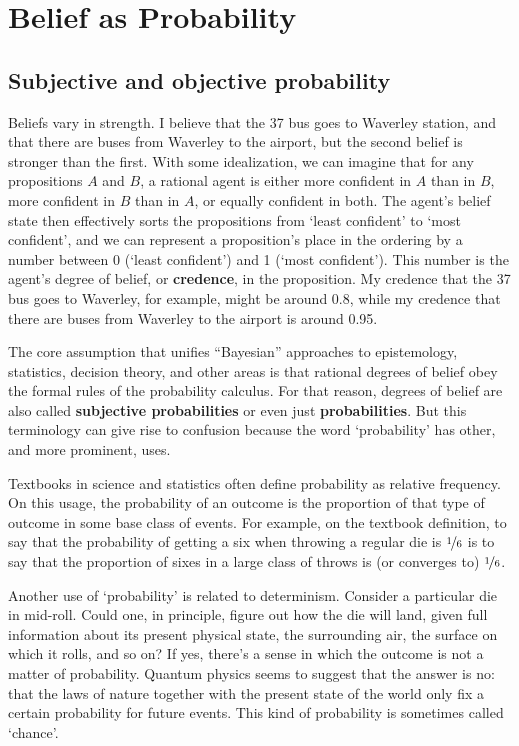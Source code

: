 \chapter{Belief as Probability}\label{ch:probability}


\section{Subjective and objective probability}

Beliefs vary in strength. I believe that the 37 bus goes to Waverley station,
and that there are buses from Waverley to the airport, but the second belief is
stronger than the first. With some idealization, we can imagine that for any
propositions $A$ and $B$, a rational agent is either more confident in $A$ than
in $B$, more confident in $B$ than in $A$, or equally confident in both. The
agent's belief state then effectively sorts the propositions from `least
confident' to `most confident', and we can represent a proposition's place in
the ordering by a number between 0 (`least confident') and 1 (`most confident').
This number is the agent's degree of belief, or \textbf{credence}, in the
proposition. My credence that the 37 bus goes to Waverley, for example, might be
around 0.8, while my credence that there are buses from Waverley to the airport
is around 0.95.

The core assumption that unifies ``Bayesian'' approaches to epistemology,
statistics, decision theory, and other areas is that rational degrees of belief
obey the formal rules of the probability calculus. For that reason, degrees of
belief are also called \textbf{subjective probabilities} or even just
\textbf{probabilities}. But this terminology can give rise to confusion because
the word `probability' has other, and more prominent, uses.

Textbooks in science and statistics often define probability as relative
frequency. On this usage, the probability of an outcome is the proportion of
that type of outcome in some base class of events. For example, on the textbook
definition, to say that the probability of getting a six when throwing a regular
die is $\nicefrac{1}{6}$ is to say that the proportion of sixes in a large class
of throws is (or converges to) $\nicefrac{1}{6}$.

Another use of `probability' is related to determinism. Consider a particular
die in mid-roll. Could one, in principle, figure out how the die will land, given
full information about its present physical state, the surrounding air, the
surface on which it rolls, and so on? If yes, there's a sense in which the
outcome is not a matter of probability. Quantum physics seems to suggest that
the answer is no: that the laws of nature together with the present state of the
world only fix a certain probability for future events. This kind of probability
is sometimes called `chance'.


